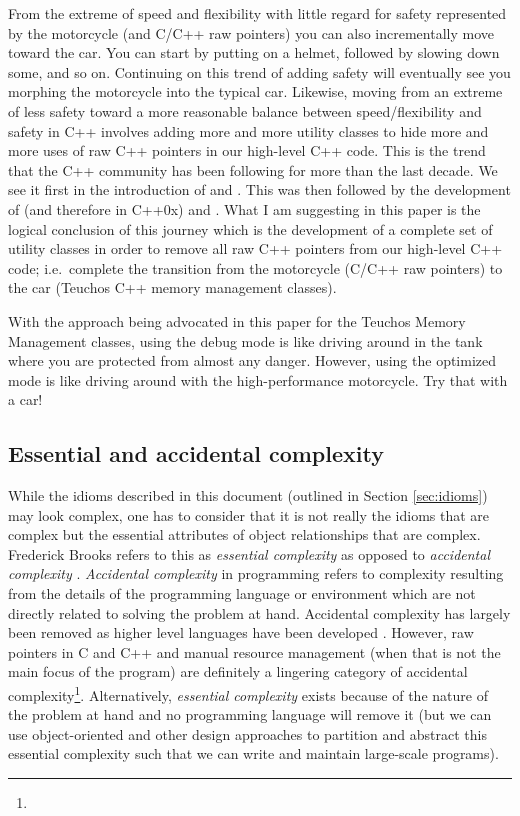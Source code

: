 \documentclass[pdf,ps2pdf,11pt]{SANDreport}
\begin{document}
From the extreme of speed and flexibility with little regard for
safety represented by the motorcycle (and C/C++ raw pointers) you can
also incrementally move toward the car.  You can start by putting on a
helmet, followed by slowing down some, and so on.  Continuing on this
trend of adding safety will eventually see you morphing the motorcycle
into the typical car.  Likewise, moving from an extreme of less safety
toward a more reasonable balance between speed/flexibility and safety
in C++ involves adding more and more utility classes to hide more and
more uses of raw C++ pointers in our high-level C++ code.  This is the
trend that the C++ community has been following for more than the last
decade.  We see it first in the introduction of
{} and {}.  This was then
followed by the development of {} (and
therefore {} in C++0x) and
{}.  What I am suggesting in this paper is
the logical conclusion of this journey which is the development of a
complete set of utility classes in order to remove all raw C++
pointers from our high-level C++ code; i.e.\ complete the transition
from the motorcycle (C/C++ raw pointers) to the car (Teuchos C++
memory management classes).

With the approach being advocated in this paper for the Teuchos Memory
Management classes, using the debug mode is like driving around in the
tank where you are protected from almost any danger.  However, using
the optimized mode is like driving around with the high-performance
motorcycle.  Try that with a car!


%
{}\subsection{Essential and accidental complexity}
\label{sec:essentail-accidental-complexity}
%

While the idioms described in this document (outlined in Section
{}\ref{sec:idioms}) may look complex, one has to consider that it is
not really the idioms that are complex but the essential attributes of
object relationships that are complex.  Frederick Brooks refers to
this as {}\textit{essential complexity} as opposed to
{}\textit{accidental complexity} {}\cite{MythicalManMonth95}.
{}\textit{Accidental complexity} in programming refers to complexity
resulting from the details of the programming language or environment
which are not directly related to solving the problem at hand.
Accidental complexity has largely been removed as higher level
languages have been developed {}\cite[Chapter 16]{MythicalManMonth95}.
However, raw pointers in C and C++ and manual resource management
(when that is not the main focus of the program) are definitely a
lingering category of accidental complexity\footnote{
{}}.
Alternatively, {}\textit{essential complexity} exists because of the
nature of the problem at hand and no programming language will remove
it (but we can use object-oriented and other design approaches to
partition and abstract this essential complexity such that we can
write and maintain large-scale programs).
\end{document}
